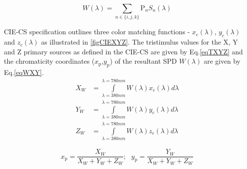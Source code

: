 \documentclass[10pt,letterpaper]{article}
\begin{document}
\begin{equation}
	W(\lambda) = \sum\limits_{n\in\{i,j,k\}}\text{P}_{n}S_{n}(\lambda)
	\label{eqWLDA}
\end{equation}

CIE-CS specification outlines three color matching functions - $x_{c}(\lambda)$, $y_{c}(\lambda)$ and $z_{c}(\lambda)$ as illustrated in \figurename\ref{figCIEXYZ}. The tristimulus values for the X, Y and Z primary sources as defined in the CIE-CS are given by Eq.\eqref{eqTXYZ} and the chromaticity coordinates ($x_{\text{p}}$,$y_{\text{p}}$) of the resultant SPD $W(\lambda)$ are given by Eq.\eqref{eqWXY}. 
\begin{equation}
	\begin{aligned}
		X_{W} &= \int\limits_{\lambda=380nm}^{\lambda=780nm}W(\lambda)x_{c}(\lambda)d\lambda\\
		Y_{W} &= \int\limits_{\lambda=380nm}^{\lambda=780nm}W(\lambda)y_{c}(\lambda)d\lambda\\
		Z_{W} &= \int\limits_{\lambda=380nm}^{\lambda=780nm}W(\lambda)z_{c}(\lambda)d\lambda
	\end{aligned}
	\label{eqTXYZ}
\end{equation}

\begin{equation}
	x_{\text{p}} = \frac{X_{W}}{X_{W}+Y_{W}+Z_{W}}; \text{  } y_{\text{p}} = \frac{Y_{W}}{X_{W}+Y_{W}+Z_{W}} %
	\label{eqWXY}
\end{equation}
\end{document}
